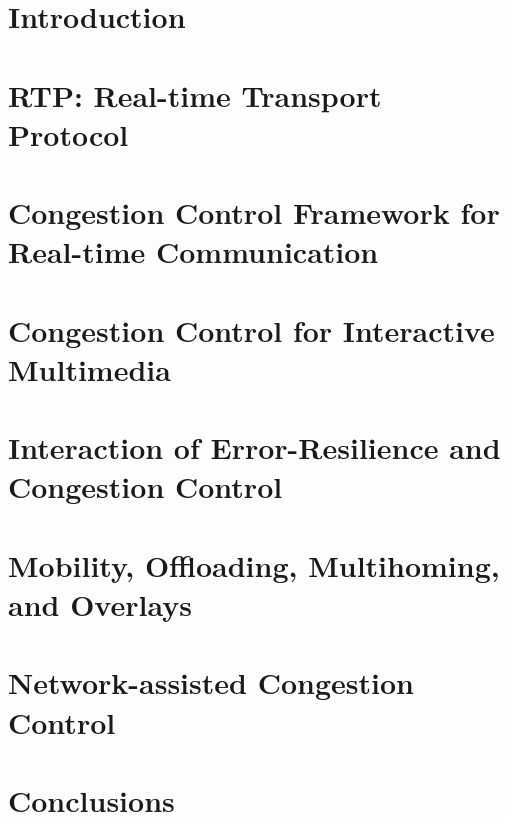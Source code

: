 \documentclass[dissertation,final]{aaltoseries} %
\begin{document}
\chapter{Introduction}
\label{chap1}


% 

\chapter{RTP: Real-time Transport Protocol}
\label{chap:rtp}


\chapter{Congestion Control Framework for Real-time Communication}
\label{chap:cc.fw}


\chapter{Congestion Control for Interactive Multimedia}
\label{chap:cc}


 \chapter{Interaction of Error-Resilience and Congestion Control}
 \label{chap:er-cc}


\chapter{Mobility, Offloading, Multihoming, and Overlays}
\label{chap:mprtp}


 \chapter{Network-assisted Congestion Control}
 \label{chap:cc.nw}
 

\chapter{Conclusions}
\label{chap:conc}
 
\end{document}
